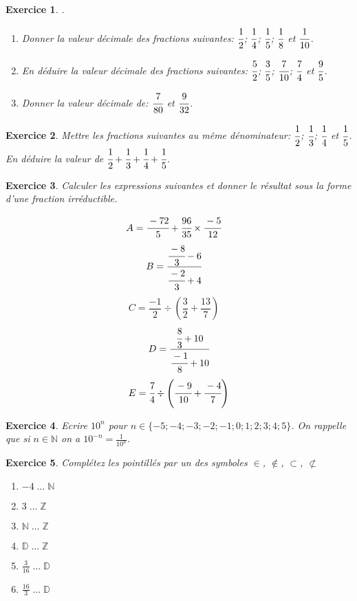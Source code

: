 \documentclass[10pt,a4paper]{article}
\newcommand{\N}{\mathbb{N}}
\newtheorem{exo}{Exercice}
\begin{document}
\newpage

\begin{exo}
.
\begin{enumerate}
\item Donner la valeur décimale des fractions suivantes: $\cfrac{1}{2}$; $\cfrac{1}{4}$; $\cfrac{1}{5}$; $\cfrac{1}{8}$ et $\cfrac{1}{10}$.
\item En déduire la valeur décimale des fractions suivantes:
 $\cfrac{5}{2}$; $\cfrac{3}{5}$; $\cfrac{7}{10}$; $\cfrac{7}{4}$ et $\cfrac{9}{5}$. 
 \item Donner la valeur décimale de: $\cfrac{7}{80}$ et $\cfrac{9}{32}$. 	
\end{enumerate}
	
\end{exo}

\begin{exo}
Mettre les fractions suivantes au même dénominateur: $\cfrac{1}{2}$; $\cfrac{1}{3}$; $\cfrac{1}{4}$ et $\cfrac{1}{5}$. 	En déduire la valeur de $\cfrac{1}{2}+\cfrac{1}{3}+\cfrac{1}{4}+\cfrac{1}{5}$.
\end{exo}


\begin{exo}
Calculer les expressions suivantes et donner le résultat sous la forme d'une fraction irréductible.
\begin{multicols}{5}\noindent
$$A= \cfrac{-72}{5}+\cfrac{96}{35}\times\cfrac{-5}{12}\quad$$
\columnbreak
$$B = \cfrac{\cfrac{-8}{3}-6}{\cfrac{-2}{3}+4}\quad$$
\columnbreak
$$ C= \frac{-1}{2}\div\left(\frac{3}{2}+\frac{13}{7}\right)\quad$$
\columnbreak
$$D= \cfrac{\cfrac{8}{3}+10}{\cfrac{-1}{8}+10} $$
\columnbreak
$$E= \cfrac{7}{4}\div\left(\cfrac{-9}{10}+\cfrac{-4}{7}\right)$$
\end{multicols}

\end{exo}
	
\begin{exo}
Ecrire $10^{n}$ pour $n\in\{-5;-4;-3;-2;-1;0;1;2;3;4;5\}$. On rappelle que si $n\in\N$ on a $10^{-n}=\frac{1}{10^{n}}$. 	
\end{exo}


\begin{exo}
    Complétez les pointillés par un des symboles $\in$, $\notin$, $\subset$, $\not\subset$
    \begin{multicols}{3}
        \begin{enumerate}
            \item $-4\;\ldots\;\mathbb{N}$
            \item $3\;\ldots\;\mathbb{Z}$
            \item $\mathbb{N}\;\ldots\;\mathbb{Z}$
            \item $\mathbb{D}\;\ldots\;\mathbb{Z}$
            \item $\frac{3}{16}\;\ldots\;\mathbb{D}$
            \item $\frac{16}{3}\;\ldots\;\mathbb{D}$
            
        \end{enumerate}
    \end{multicols}
    \end{exo}
\end{document}
